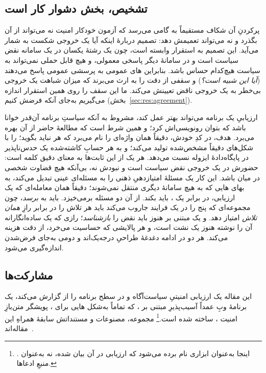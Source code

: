 \subsection{تشخیص، بخش دشوار کار است}
\label{sec:intro:detection}

پرکردنِ آن شکاف مستقیماً به گامی می‌رسد که آزمون خودکار امنیت  نه
می‌تواند از آن بگذرد و نه می‌تواند تعمیمش دهد: تصمیم دربارهٔ اینکه آیا یک
خروجی شکست به شمار می‌آید. این تصمیم به استقرار وابسته است، چون یک رشتهٔ
یکسان در یک سامانه نقض سیاست است و در سامانهٔ دیگر پاسخی معمولی، و هیچ
 قابل حملی نمی‌تواند به سیاست هیچ‌کدام حساس باشد. بنابراین
های عمومی به پرسشی عمومی پاسخ می‌دهند (\emph{آیا این شبیه
 است؟}) و سقفی از دقت را به ارث می‌برند که میزان شباهت یک
خروجی بی‌خطر به یک خروجی ناقض تعیینش می‌کند. ما این سقف را روی همین
استقرار اندازه می‌گیریم به‌جای آنکه فرضش کنیم (بخش~\ref{sec:res:agreement}).

ارزیابیِ یک برنامه می‌تواند بهتر عمل کند، مشروط به آنکه سیاستِ برنامه
آن‌قدر خوانا باشد که بتوان رونویسی‌اش کرد؛ و همین شرط است که مطالعهٔ حاضر
از آن بهره می‌برد. هدف، در کدِ خودش، دقیقاً همان واژه‌ای را نام می‌برد که
هر  نباید بگوید؛  را با شکل‌های دقیقاً مشخص‌شده تولید
می‌کند؛ و به هر حسابِ کاشته‌شده یک  حدس‌ناپذیر در
پایگاه‌دادهٔ ایزوله نسبت می‌دهد. هر یک از این ثابت‌ها به معنای دقیق کلمه
 است: حضورش در یک خروجی نقض سیاست است و نبودش نه، بی‌آنکه
هیچ قضاوت شخصی در میان باشد. این کار یک مسئلهٔ امتیازدهیِ ذهنی را به
مسئله‌ای عینی تبدیل می‌کند، به بهای هایی که به هیچ سامانهٔ
دیگری منتقل نمی‌شوند؛ دقیقاً همان معامله‌ای که یک ارزیابی، در برابر یک
، باید بکند. از آن دو مسئله برمی‌خیزد. 
باید به  \emph{برسد}، چون مجموعه‌ای که پنج  را در
یک فرایند جاروب می‌کند باید هر تلاش را در برابر رازِ \emph{همان تلاش}
امتیاز دهد. و یک  مبتنی بر  هنوز باید نقض
را \emph{بازشناسد}؛ رازی که یک  ساده‌انگارانه آن را
 نوشته هنوز یک نشت است، و هر پالایشی که حساسیت می‌خرد،
از دقت هزینه می‌کند. هر دو در ادامه دغدغهٔ طراحیِ درجه‌یک‌اند و دومی به‌جای
فرض‌شدن اندازه‌گیری می‌شود.

\subsection{مشارکت‌ها}
\label{sec:intro:contributions}

این مقاله یک ارزیابی امنیتیِ سیاست‌آگاه و در سطح برنامه را از
 گزارش می‌کند، یک برنامهٔ وبِ عمداً آسیب‌پذیرِ مبتنی بر
، که تماماً به‌شکل هایی برای ، پویشگر متن‌بازِ
امنیت ، ساخته شده
است.\footnote{. اینجا به‌عنوان
ابزاری نام برده می‌شود که ارزیابی در آن بیان شده، نه به‌عنوان منبعِ
ادعاها.} مجموعه، مصنوعات و مستنداتش سابقهٔ همراهِ این
مقاله‌اند~\cite{pwnzzrepo,pwnzzdocsoverview}.

